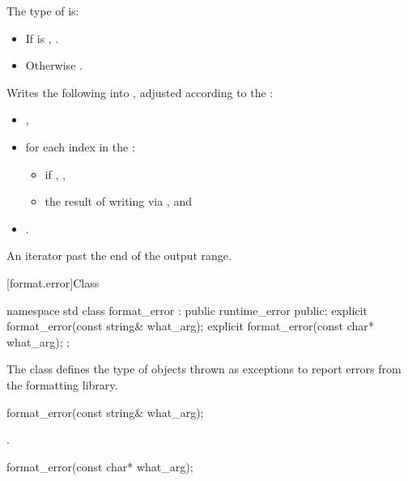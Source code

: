 \begin{itemdescr}
\pnum
The type of  is:
\begin{itemize}
\item
If  is ,
.
\item
Otherwise .
\end{itemize}

\pnum
\effects
Writes the following into ,
adjusted according to the :
\begin{itemize}
\item
{},
\item
for each index  in the :
\begin{itemize}
\item
if , ,
\item
the result of writing 
via , and
\end{itemize}
\item
{}.
\end{itemize}

\pnum
\returns
An iterator past the end of the output range.
\end{itemdescr}

[format.error]{Class }

%
\begin{codeblock}
namespace std {
  class format_error : public runtime_error {
  public:
    explicit format_error(const string& what_arg);
    explicit format_error(const char* what_arg);
  };
}
\end{codeblock}

\pnum
The class  defines the type of objects thrown as
exceptions to report errors from the formatting library.

%
\begin{itemdecl}
format_error(const string& what_arg);
\end{itemdecl}

\begin{itemdescr}
\pnum
\ensures
{}.

%
\end{itemdescr}
\begin{itemdecl}
format_error(const char* what_arg);
\end{itemdecl}

